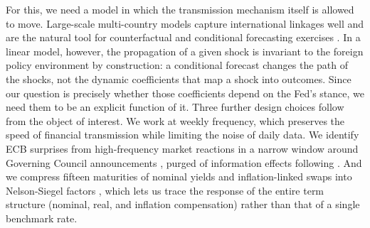 For this, we need a model in which the transmission mechanism itself is allowed to move. Large-scale multi-country models capture international linkages well and are the natural tool for counterfactual and conditional forecasting exercises \citep[among many others,][]{dees2007exploring, feldkircher2016international, georgiadis2017bi, koop2016model, burriel2018uncovering, dees2021global}. In a linear model, however, the propagation of a given shock is invariant to the foreign policy environment by construction: a conditional forecast changes the path of the shocks, not the dynamic coefficients that map a shock into outcomes. Since our question is precisely whether those coefficients depend on the Fed's stance, we need them to be an explicit function of it. Three further design choices follow from the object of interest. We work at weekly frequency, which preserves the speed of financial transmission while limiting the noise of daily data. We identify ECB surprises from high-frequency market reactions in a narrow window around Governing Council announcements \citep{altavilla2019measuring}, purged of information effects following \citet{jarocinski2020deconstructing}. And we compress fifteen maturities of nominal yields and inflation-linked swaps into Nelson-Siegel factors \citep{DIEBOLD2006337}, which lets us trace the response of the entire term structure (nominal, real, and inflation compensation) rather than that of a single benchmark rate.

